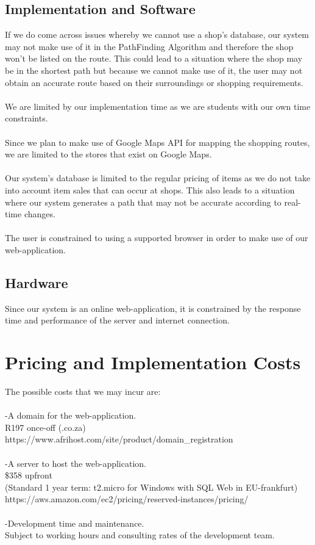 \documentclass[12pt]{article}
\begin{document}
\subsection{Implementation and Software}
If we do come across issues whereby we cannot use a shop's database, our system may not make use of it in the PathFinding Algorithm and therefore the shop won't be listed on the route. This could lead to a situation where the shop may be in the shortest path but because we cannot make use of it, the user may not obtain an accurate route based on their surroundings or shopping requirements.\\\\
We are limited by our implementation time as we are students with our own time constraints.\\\\
Since we plan to make use of Google Maps API for mapping the shopping routes, we are limited to the stores that exist on Google Maps.\\\\
Our system's database is limited to the regular pricing of items as we do not take into account item sales that can occur at shops. This also leads to a situation where our system generates a path that may not be accurate according to real-time changes.\\\\
The user is constrained to using a supported browser in order to make use of our web-application.
\subsection{Hardware}
Since our system is an online web-application, it is constrained by the response time and performance of the server and internet connection.

\section{Pricing and Implementation Costs}
The possible costs that we may incur are:\\\\
-A domain for the web-application.\\
 R197 once-off   (.co.za)\\
 https://www.afrihost.com/site/product/domain{\_}registration\\\\
-A server to host the web-application.\\
\$358 upfront \\
(Standard 1 year term: t2.micro for Windows with SQL Web in EU-frankfurt)\\
https://aws.amazon.com/ec2/pricing/reserved-instances/pricing/\\\\
-Development time and maintenance.\\
Subject to working hours and consulting rates of the development team.
\end{document}
